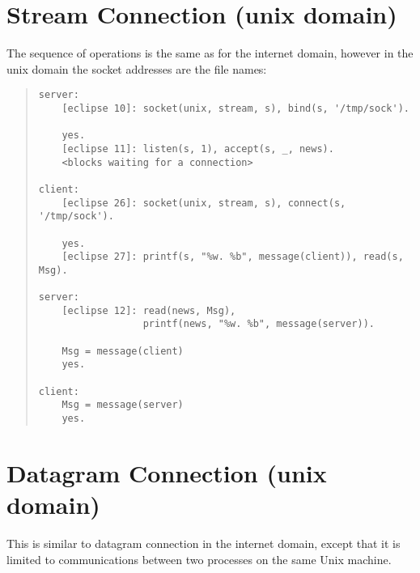 \section{Stream Connection (unix domain)}
The sequence of operations is the same as for the internet domain,
however in the unix domain the socket addresses are
the file names:

\begin{quote}
\begin{verbatim}
server:
    [eclipse 10]: socket(unix, stream, s), bind(s, '/tmp/sock').

    yes.
    [eclipse 11]: listen(s, 1), accept(s, _, news).
    <blocks waiting for a connection>

client:
    [eclipse 26]: socket(unix, stream, s), connect(s, '/tmp/sock').

    yes.
    [eclipse 27]: printf(s, "%w. %b", message(client)), read(s, Msg).

server:
    [eclipse 12]: read(news, Msg),
                  printf(news, "%w. %b", message(server)).

    Msg = message(client)
    yes.

client:
    Msg = message(server)
    yes.
\end{verbatim}
\end{quote}

\section{Datagram Connection (unix domain)}
This is similar to datagram connection in the internet domain, except that
it is limited to communications between two processes on the same Unix
machine.

